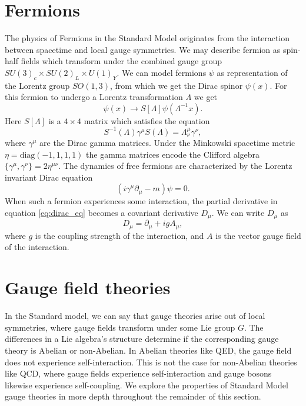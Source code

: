 \section{Fermions}\label{sec:Fermions}
The physics of Fermions in the Standard Model originates from the interaction between spacetime and local gauge symmetries.  We may describe fermion as spin-half fields which transform under the combined gauge group $SU(3)_c\times SU(2)_L\times U(1)_Y$.  We can model fermions $\psi$ as representation of the Lorentz group $SO(1,3)$, from which we get the Dirac spinor $\psi(x)$.  For this fermion to undergo a Lorentz transformation $\Lambda$ we get 
\begin{equation}\label{eq:lorentz}
    \psi(x) \rightarrow S[\Lambda]\psi(\Lambda^{-1}x).
\end{equation}
Here $S[\Lambda]$ is a $4\times4$ matrix which satisfies the equation
\begin{equation}
    S^{-1}(\Lambda)\gamma^\mu S(\Lambda) = \Lambda^\mu_\nu \gamma^\nu,
\end{equation}
where $\gamma^\mu$ are the Dirac gamma matrices.  Under the Minkowski spacetime metric $\eta=\mathrm{diag(-1,1,1,1)}$ the gamma matrices encode the Clifford algebra $\{\gamma^\mu,\gamma^\nu\} = 2\eta^{\mu\nu}$.  The dynamics of free fermions are characterized by the Lorentz invariant Dirac equation
\begin{equation}\label{eq:dirac_eq}
    (i\gamma^\mu\partial_\mu - m)\psi = 0.
\end{equation}
When such a fermion experiences some interaction, the partial derivative in equation \ref{eq:dirac_eq} becomes a covariant derivative $D_\mu$.  We can write $D_\mu$ as
\begin{equation}
    D_\mu = \partial_\mu + igA_\mu,
\end{equation}
where $g$ is the coupling strength of the interaction, and $A$ is the vector gauge field of the interaction.

\section{Gauge field theories}\label{sec:gauge_field_theories}
In the Standard model, we can say that gauge theories arise out of local symmetries, where gauge fields transform under some Lie group $G$.  The differences in a Lie algebra's structure determine if the corresponding gauge theory is Abelian or non-Abelian.  In Abelian theories like QED, the gauge field does not experience self-interaction.  This is not the case for non-Abelian theories like QCD, where  gauge fields experience self-interaction and gauge bosons likewise experience self-coupling.  We explore the properties of Standard Model gauge theories in more depth throughout the remainder of this section.

